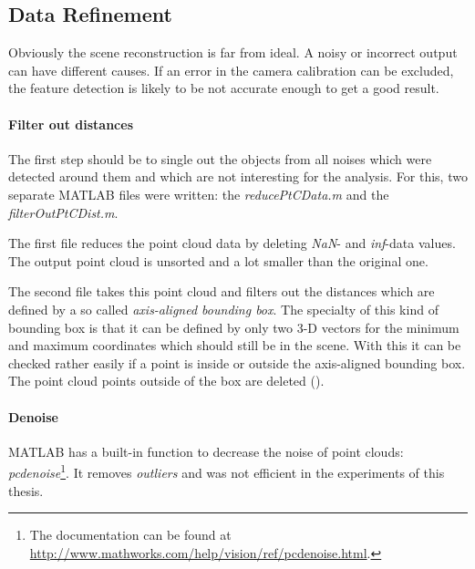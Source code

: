 \subsection{Data Refinement}\label{ssec:DataRefinement}
Obviously the scene reconstruction is far from ideal. A noisy or incorrect output can have different causes. If an error in the camera calibration can be excluded, the feature detection is likely to be not accurate enough to get a good result. 


\paragraph{Filter out distances}
The first step should be to single out the objects from all noises which were detected around them and which are not interesting for the analysis. For this, two separate MATLAB files were written: the \textit{reducePtCData.m} and the \textit{filterOutPtCDist.m}.

The first file reduces the point cloud data by deleting \textit{NaN}- and \textit{inf}-data values. The output point cloud is unsorted and a lot smaller than the original one.

The second file takes this point cloud and filters out the distances which are defined by a so called \textit{axis-aligned bounding box}. The specialty of this kind of bounding box is that it can be defined by only two 3-D vectors for the minimum and maximum coordinates which should still be in the scene. With this it can be checked rather easily if a point is inside or outside the axis-aligned bounding box. The point cloud points outside of the box are deleted (\cite[p.216 et seq.]{Gregory.2014}).

\paragraph{Denoise}
MATLAB has a built-in function to decrease the noise of point clouds: \textit{pcdenoise}\footnote{The documentation can be found at \url{http://www.mathworks.com/help/vision/ref/pcdenoise.html}.}. It removes \textit{outliers} and was not efficient in the experiments of this thesis. 

